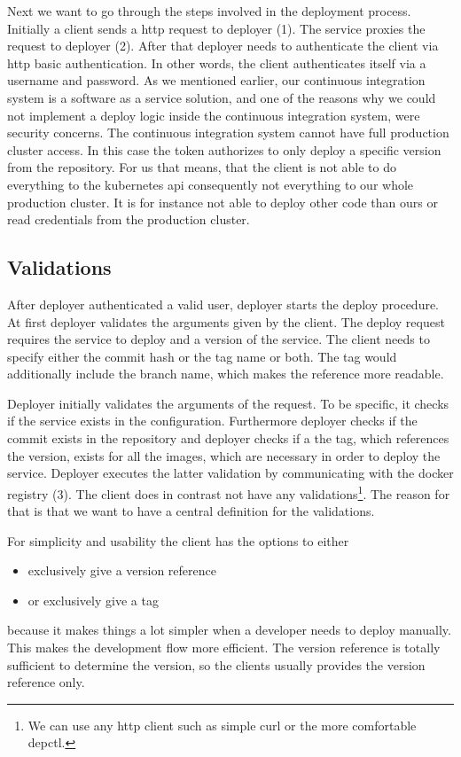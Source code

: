 Next we want to go through the steps involved in the deployment process. Initially a
client sends a http request to deployer (1). The service proxies the request to deployer
(2). After that deployer needs to authenticate the client via http basic
authentication. In other words, the client authenticates itself via a username and
password. As we mentioned earlier, our continuous integration system is a software as a
service solution, and one of the reasons why we could not implement a deploy logic inside
the continuous integration system, were security concerns. The continuous integration
system cannot have full production cluster access. In this case the token authorizes to
only deploy a specific version from the repository. For us that means, that the client is
not able to do everything to the kubernetes api consequently not everything to our whole
production cluster. It is for instance not able to deploy other code than ours or read
credentials from the production cluster.

\subsection{Validations}

After deployer authenticated a valid user, deployer starts the deploy procedure. At first
deployer validates the arguments given by the client. The deploy request requires the
service to deploy and a version of the service. The client needs to specify either the
commit hash or the tag name or both. The tag would additionally include the branch name,
which makes the reference more readable.

Deployer initially validates the arguments of the request. To be specific, it checks if
the service exists in the configuration. Furthermore deployer checks if the commit exists
in the repository and deployer checks if a the tag, which references the version, exists
for all the images, which are necessary in order to deploy the service. Deployer executes
the latter validation by communicating with the docker registry (3). The client does in
contrast not have any validations\footnote{We can use any http client such as simple curl
or the more comfortable depctl.}. The reason for that is that we want to have a central
definition for the validations.

For simplicity and usability the client has the options to either
\begin{itemize}
    \item exclusively give a version reference
    \item or exclusively give a tag
\end{itemize}
because it makes things a lot simpler when a developer needs to deploy
manually. This makes the development flow more efficient. The version reference is totally
sufficient to determine the version, so the clients usually provides the version reference
only.

